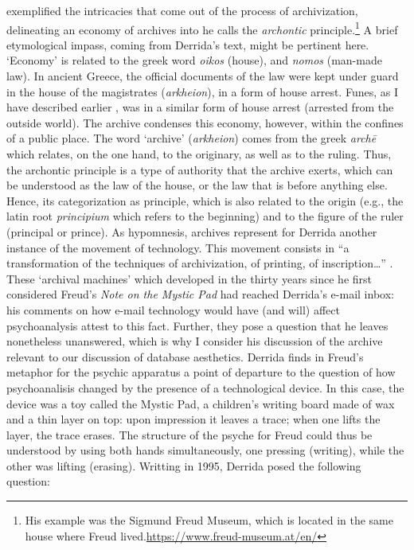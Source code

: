 \textcite{Der95:Arc} exemplified the intricacies that come out of the process of archivization, delineating an economy of archives into he calls the \textit{archontic} principle.\footnote{His example was the Sigmund Freud Museum, which is located in the same house where Freud lived.\url{https://www.freud-museum.at/en/}} A brief etymological impass, coming from Derrida's text, might be pertinent here. `Economy' is related to the greek word \textit{oikos} (house), and \textit{nomos} (man-made law). In ancient Greece, the official documents of the law were kept under guard in the house of the magistrates (\textit{arkheion}), in a form of house arrest. Funes, as I have described earlier , was in a similar form of house arrest (arrested from the outside world). The archive condenses this economy, however, within the confines of a public place. The word `archive' (\textit{arkheion}) comes from the greek \textit{archē} which relates, on the one hand, to the originary, as well as to the ruling. Thus, the archontic principle is a type of authority that the archive exerts, which can be understood as the law of the house, or the law that is before anything else. Hence, its categorization as principle, which is also related to the origin (e.g., the latin root \textit{principium} which refers to the beginning) and to the figure of the ruler (principal or prince). As hypomnesis, archives represent for Derrida another instance of the movement of technology. This movement consists in ``a transformation of the techniques of archivization, of printing, of inscription\dots'' \parencite[16]{Der95:Arc}. These `archival machines' which developed in the thirty years since he first considered Freud's \textit{Note on the Mystic Pad} had reached Derrida's e-mail inbox: his comments on how e-mail technology would have (and will) affect psychoanalysis attest to this fact. Further, they pose a question that he leaves nonetheless unanswered, which is why I consider his discussion of the archive relevant to our discussion of database aesthetics. Derrida finds in Freud's metaphor for the psychic apparatus a point of departure to the question of how psychoanalisis changed by the presence of a technological device. In this case, the device was a toy called the Mystic Pad, a children's writing board made of wax and a thin layer on top: upon impression it leaves a trace; when one lifts the layer, the trace erases. The structure of the psyche for Freud could thus be understood by using both hands simultaneously, one pressing (writing), while the other was lifting (erasing). Writting in 1995, Derrida posed the following question:

